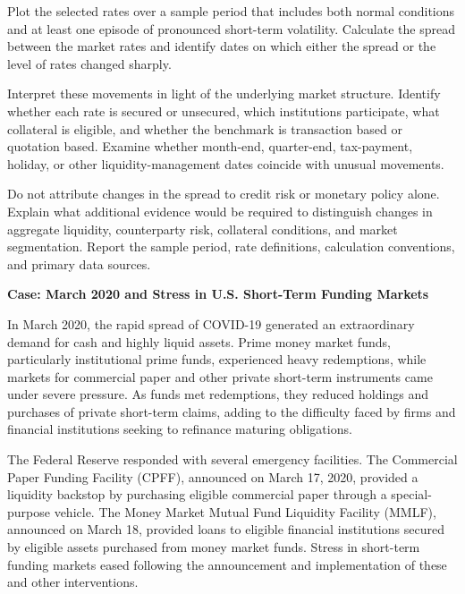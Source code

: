 Plot the selected rates over a sample period that includes both normal conditions and at least one episode of pronounced short-term volatility. Calculate the spread between the market rates and identify dates on which either the spread or the level of rates changed sharply.

Interpret these movements in light of the underlying market structure. Identify whether each rate is secured or unsecured, which institutions participate, what collateral is eligible, and whether the benchmark is transaction based or quotation based. Examine whether month-end, quarter-end, tax-payment, holiday, or other liquidity-management dates coincide with unusual movements.

Do not attribute changes in the spread to credit risk or monetary policy alone. Explain what additional evidence would be required to distinguish changes in aggregate liquidity, counterparty risk, collateral conditions, and market segmentation. Report the sample period, rate definitions, calculation conventions, and primary data sources.



\textbf{Case: March 2020 and Stress in U.S. Short-Term Funding Markets}

In March 2020, the rapid spread of COVID-19 generated an extraordinary demand for cash and highly liquid assets. Prime money market funds, particularly institutional prime funds, experienced heavy redemptions, while markets for commercial paper and other private short-term instruments came under severe pressure. As funds met redemptions, they reduced holdings and purchases of private short-term claims, adding to the difficulty faced by firms and financial institutions seeking to refinance maturing obligations.

The Federal Reserve responded with several emergency facilities. The Commercial Paper Funding Facility (CPFF), announced on March 17, 2020, provided a liquidity backstop by purchasing eligible commercial paper through a special-purpose vehicle. The Money Market Mutual Fund Liquidity Facility (MMLF), announced on March 18, provided loans to eligible financial institutions secured by eligible assets purchased from money market funds. Stress in short-term funding markets eased following the announcement and implementation of these and other interventions.

